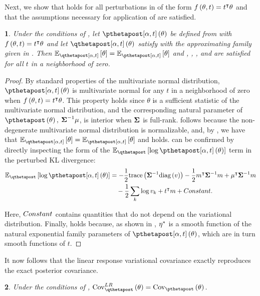 \documentclass{article}\usepackage[]{graphicx}\usepackage[]{color}
\theoremstyle{plain}
\newtheorem{thm}{\protect\theoremname}[section]
\theoremstyle{definition}
\theoremstyle{plain}
\theoremstyle{plain}
\theoremstyle{plain}
\theoremstyle{plain}
\newtheorem{lem}[thm]{\protect\lemmaname}
\providecommand{\lemmaname}{Lemma}
\providecommand{\theoremname}{Theorem}
\begin{document}
Next, we show that  holds for all perturbations
in  of the form $f\left(\theta,t\right)=t^{\intercal}\theta$
and that the assumptions necessary for application of 
are satisfied.
\begin{lem}
\label{lem:mvn_perturbation_exact}Under the conditions of ,
let $\ptthetapost\left(\theta\right)$ be defined from 
with $f\left(\theta,t\right)=t^{\intercal}\theta$ and let $\qtthetapost\left(\theta\right)$
satisfy  with the approximating
family given in . Then $\mbe_{\qtthetapost}\left[\theta\right]=\mbe_{\ptthetapost}\left[\theta\right]$
and , ,
, and  are
satisfied for all $t$ in a neighborhood of zero. 
\end{lem}

\begin{proof}
By standard properties of the multivariate normal distribution, $\ptthetapost\left(\theta\right)$
is multivariate normal for any $t$ in a neighborhood of zero when
$f\left(\theta,t\right)=t^{\intercal}\theta$. This property holds since
$\theta$ is a sufficient statistic of the multivariate normal distribution,
and the corresponding natural parameter of $\pthetapost\left(\theta\right),$
$\boldsymbol{\Sigma}^{-1}\mu$, is interior when $\boldsymbol{\Sigma}$ is full-rank. 
follows because the non-degenerate multivariate normal distribution
is normalizable, and, by , we have that
$\mbe_{\qtthetapost}\left[\theta\right]=\mbe_{\ptthetapost}\left[\theta\right]$
and  holds. 
can be confirmed by directly inspecting the form of the $\mbeq\left[\log\ptthetapost\left(\theta\right)\right]$
term in the perturbed KL divergence:
\begin{align*}
\mbeq\left[\log\ptthetapost\left(\theta\right)\right] & =-\frac{1}{2}\textrm{trace}\left(\covmat^{-1}\textrm{diag}\left(v\right)\right)-\frac{1}{2}m^{\trans}\covmat^{-1}m+\mu^{\trans}\covmat^{-1}m\\
 & \quad-\frac{1}{2}\sum_{k}\log v_{k}+t^{\trans}m+\constant.
\end{align*}

Here, $Constant$ contains quantities that do not depend on the variational
distribution. Finally,  holds because,
as shown in , $\eta^{*}$ is a smooth function
of the natural exponential family parameters of $\ptthetapost\left(\theta\right)$,
which are in turn smooth functions of $t$.
\end{proof}
It now follows that the linear response variational covariance exactly
reproduces the exact posterior covariance.
\begin{thm}
\label{thm:mvn_cov_exact}Under the conditions of ,
$\lrvbcov\left(\theta\right)=\cov_{\pthetapost}\left(\theta\right)$.
\end{thm}
\end{document}
